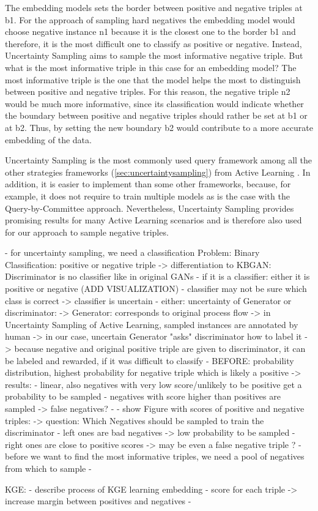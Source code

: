The embedding models sets the border between positive and negative triples at b1.
For the approach of sampling hard negatives the embedding model would choose negative instance n1 because it is the closest one to the border b1 and therefore, it is the most difficult one to classify as positive or negative.
Instead, Uncertainty Sampling aims to sample the most informative negative triple.
But what is the most informative triple in this case for an embedding model?
The most informative triple is the one that the model helps the most to distinguish between positive and negative triples.
For this reason, the negative triple n2 would be much more informative, since its classification would indicate whether the boundary between positive and negative triples should rather be set at b1 or at b2.
Thus, by setting the new boundary b2 would contribute to a more accurate embedding of the data.





Uncertainty Sampling is the most commonly used query framework among all the other strategies frameworks (\autoref{sec:uncertaintysampling}) from Active Learning \cite{Settles2009ActiveLL}.
In addition, it is easier to implement than some other frameworks, because, for example, it does not require to train multiple models as is the case with the Query-by-Committee approach.
Nevertheless, Uncertainty Sampling provides promising results for many Active Learning scenarios and is therefore also used for our approach to sample negative triples.



- for uncertainty sampling, we need a classification Problem: Binary Classification: positive or negative triple
-> differentiation to KBGAN: Discriminator is no classifier like in original GANs
- if it is a classifier: either it is positive or negative (ADD VISUALIZATION)
- classifier may not be sure which class is correct -> classifier is uncertain
- either: uncertainty of Generator or discriminator:
-> Generator: corresponds to original process flow
-> in Uncertainty Sampling of Active Learning, sampled instances are annotated by human
-> in our case, uncertain Generator "asks" discriminator how to label it
-> because negative and original positive triple are given to discriminator, it can be labeled and rewarded, if it was difficult to classify
- BEFORE: probability distribution, highest probability for negative triple which is likely a positive
-> results: 
    - linear, also negatives with very low score/unlikely to be positive get a probability to be sampled 
    - negatives with score higher than positives are sampled -> false negatives?
    - 
- show Figure with scores of positive and negative triples:
-> question: Which Negatives should be sampled to train the discriminator
- left ones are bad negatives -> low probability to be sampled
- right ones are close to positive scores -> may be even a false negative triple ?
- before we want to find the most informative triples, we need a pool of negatives from which to sample
-  
    
KGE: 
- describe process of KGE learning embedding
- score for each triple -> increase margin between positives and negatives
- 

